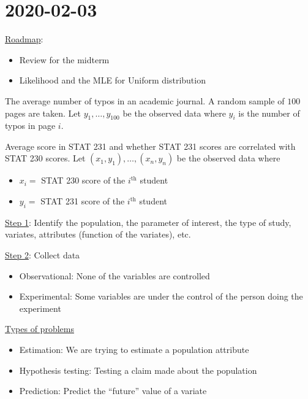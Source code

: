 \section{2020-02-03}
\underline{Roadmap}:
\begin{itemize}
    \item Review for the midterm
    \item Likelihood and the MLE for Uniform distribution
\end{itemize}
\begin{exbox}
    \begin{example}
        The average number of typos in an academic journal. A random
        sample of $ 100 $ pages are taken. Let $ y_1,\ldots ,y_{100} $
        be the observed data where $ y_i $ is the number of typos
        in page $ i $.
    \end{example}
\end{exbox}
\begin{exbox}
    \begin{example}
        Average score in STAT 231 and whether STAT 231 scores
        are correlated with STAT 230 scores.
        Let $ (x_1,y_1),\ldots ,(x_n,y_n) $ be the observed data
        where
        \begin{itemize}
            \item $ x_i= $ STAT 230 score of the $ i^{\text{th}} $ student
            \item $ y_i= $ STAT 231 score of the $ i^{\text{th}} $ student
        \end{itemize}
    \end{example}
\end{exbox}
\underline{Step 1}: Identify the population, the parameter of interest,
the type of study, variates, attributes (function of the variates), etc.

\underline{Step 2}: Collect data
\begin{itemize}
    \item Observational: None of the variables are controlled
    \item Experimental: Some variables are under the control of the person
          doing the experiment
\end{itemize}
\underline{Types of problems}
\begin{itemize}
    \item Estimation: We are trying to estimate a population attribute
    \item Hypothesis testing: Testing a claim made about the population
    \item Prediction: Predict the ``future'' value of a variate
\end{itemize}

